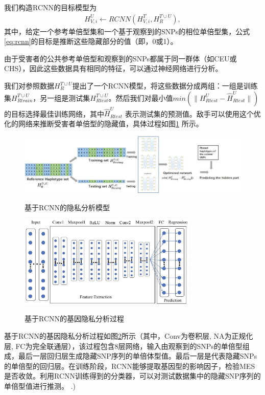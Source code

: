 我们构造RCNN的目标模型为
\begin{align}\label{eq:rcnn}
H_{V,i}^U  \leftarrow RCNN(H_{V,i}^T, H_R^{T \cup U}),
\end{align}
其中，给定一个参考单倍型集和一个基于观察到的SNPs的相位单倍型集，公式\ref{eq:rcnn}的目标是推断这些隐藏部分的值（即，0或1）。

由于受害者的公共参考单倍型和观察到的SNPs都属于同一群体（如CEU或CHS\cite{igsr2015which}），因此这些数据具有相同的特征，可以通过神经网络进行分析。

我们对参照数据$H_R^{T \cup U}$提出了一个RCNN模型，将这些数据分成两组：一组是训练集$H_{Rtrain}^{T \cup U}$，另一组是测试集$H_{Rtest}^{T \cup U}$。然后我们对最小值$min(\|H_{Rtest}^{ U} - \hat{H}_{Rtest}^{U}\|)$的目标选择最佳训练网络，其中$\hat{H}_{Rtest}^{U}$ 表示测试集的预测值。敌手可以使用这个优化的网络来推断受害者单倍型的隐藏值，具体过程如图\ref{fig:rcnn_infer} 所示。

\begin{figure}
	\centering
	\includegraphics[width=14cm]{./figures/Fig3-RCNN-inference-attack.eps}\\
	\caption{基于RCNN的隐私分析模型}
	\label{fig:rcnn_infer}
\end{figure}


\begin{figure}
	\centering
	\includegraphics[width=8.5cm]{./figures/Fig4-RCNN-structure.eps}\\
	\caption{基于RCNN的基因隐私分析过程}
	\label{fig:RCNN}
\end{figure}
基于RCNN的基因隐私分析过程如图\ref{fig:RCNN}所示（其中，Conv为卷积层, NA为正规化层, FC为完全联通层），该过程包含8层网络，输入由观察到的SNPs的单倍型组成，最后一层回归层生成隐藏SNP序列的单倍体型值。最后一层是代表隐藏SNPs的单倍型的回归层。在训练阶段，RCNN能够提取基因型的影响因子，检验MES是否收敛。利用RCNN训练得到的分类器，可以对测试数据集中的隐藏SNP序列的单倍型值进行推测。
.) 

